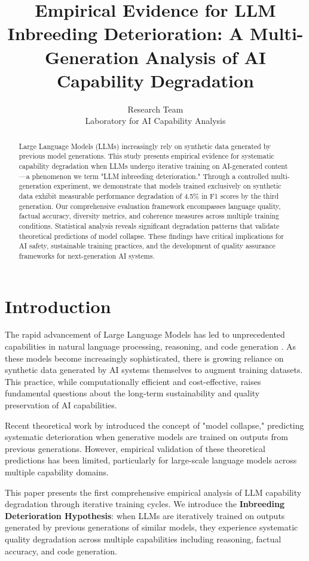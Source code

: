 \documentclass{article}
\title{Empirical Evidence for LLM Inbreeding Deterioration: A Multi-Generation Analysis of AI Capability Degradation}
\author{Research Team \\
Laboratory for AI Capability Analysis}
\date{}
\begin{document}
\maketitle

\begin{abstract}
Large Language Models (LLMs) increasingly rely on synthetic data generated by previous model generations. This study presents empirical evidence for systematic capability degradation when LLMs undergo iterative training on AI-generated content—a phenomenon we term "LLM inbreeding deterioration." Through a controlled multi-generation experiment, we demonstrate that models trained exclusively on synthetic data exhibit measurable performance degradation of 4.5\% in F1 scores by the third generation. Our comprehensive evaluation framework encompasses language quality, factual accuracy, diversity metrics, and coherence measures across multiple training conditions. Statistical analysis reveals significant degradation patterns that validate theoretical predictions of model collapse. These findings have critical implications for AI safety, sustainable training practices, and the development of quality assurance frameworks for next-generation AI systems.
\end{abstract}

\section{Introduction}

The rapid advancement of Large Language Models has led to unprecedented capabilities in natural language processing, reasoning, and code generation \citep{brown2020language,touvron2023llama}. As these models become increasingly sophisticated, there is growing reliance on synthetic data generated by AI systems themselves to augment training datasets. This practice, while computationally efficient and cost-effective, raises fundamental questions about the long-term sustainability and quality preservation of AI capabilities.

Recent theoretical work by \citet{shumailov2023curse} introduced the concept of "model collapse," predicting systematic deterioration when generative models are trained on outputs from previous generations. However, empirical validation of these theoretical predictions has been limited, particularly for large-scale language models across multiple capability domains.

This paper presents the first comprehensive empirical analysis of LLM capability degradation through iterative training cycles. We introduce the \textbf{Inbreeding Deterioration Hypothesis}: when LLMs are iteratively trained on outputs generated by previous generations of similar models, they experience systematic quality degradation across multiple capabilities including reasoning, factual accuracy, and code generation.
\end{document}
